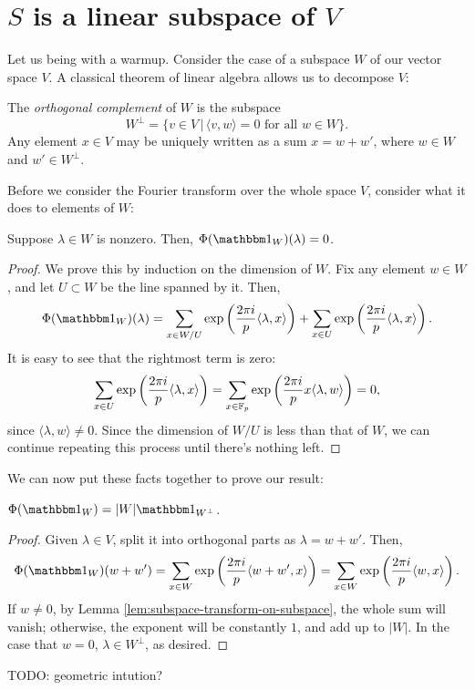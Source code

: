 \section{$S$ is a linear subspace of $V$}

Let us being with a warmup. Consider the case of a subspace $W$ of our vector space $V$.
A classical theorem of linear algebra allows us to decompose $V$:
\begin{prop}
    The \emph{orthogonal complement} of $W$ is the subspace    
    \[ W^\perp = \{ v \in V \,|\, \langle v, w \rangle = 0 \text{ for all } w \in W \}. \]
    Any element $x\in V$ may be uniquely written as a sum $x = w + w'$, where $w\in W$
    and $w'\in W^\perp$.
\end{prop}

Before we consider the Fourier transform over the whole space $V$, consider what
it does to elements of $W$:
\begin{lem}
    \label{lem:subspace-transform-on-subspace}
    Suppose $\lambda\in W$ is nonzero. Then, $\Phi(\IND_W)(\lambda) = 0$.
    \begin{proof}
        We prove this by induction on the dimension of $W$. Fix any element $w\in W$,
        and let $U\subset W$ be the line spanned by it. Then,   
        \[ \Phi(\IND_W)(\lambda) = 
            \sum_{x\in W/U} 
                \exp \left(\frac{2\pi i}{p} \langle \lambda, x \rangle\right) +
            \sum_{x\in U} 
                \exp \left(\frac{2\pi i}{p} \langle \lambda, x \rangle\right). \]
        It is easy to see that the rightmost term is zero:
        \[ \sum_{x\in U} 
                \exp \left(\frac{2\pi i}{p} \langle \lambda, x \rangle\right) =
            \sum_{x\in \mathbb{F}_p} 
                \exp \left(\frac{2\pi i}{p} x \langle \lambda, w \rangle\right) = 0,
                \]
        since $\langle \lambda, w \rangle \neq 0$. Since the dimension of $W/U$ is less
        than that of $W$, we can continue repeating this process until there's nothing left.
    \end{proof}
\end{lem}
We can now put these facts together to prove our result:
\begin{thm}
    $\Phi(\IND_W) = |W| \IND_{W^\perp}$.
    \begin{proof}
        Given $\lambda\in V$, split it into orthogonal parts as $\lambda = w + w'$. Then,
        \[ \Phi(\IND_W)(w + w') = 
            \sum_{x\in W} 
                \exp \left(\frac{2\pi i}{p} \langle w + w', x \rangle\right) = 
            \sum_{x\in W} 
                \exp \left(\frac{2\pi i}{p} \langle w, x \rangle\right). \]
        If $w\neq 0$, by Lemma \ref{lem:subspace-transform-on-subspace}, the whole
        sum will vanish; otherwise, the exponent will be constantly $1$, and add up to
        $|W|$. In the case that $w = 0$, $\lambda\in W^\perp$, as desired.
    \end{proof}
\end{thm}
TODO: geometric intution?

